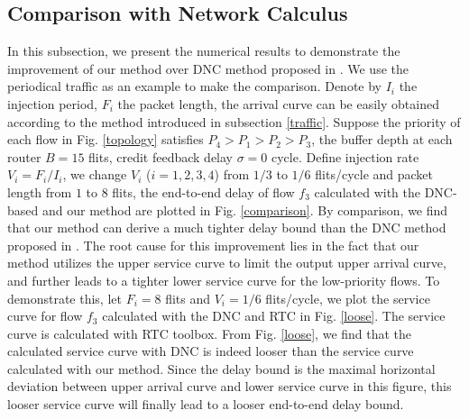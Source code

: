 \documentclass[10pt,journal]{IEEEtran}
\begin{document}
\subsection{Comparison with Network Calculus}\label{dnccmp}
In this subsection, we present the numerical results to demonstrate the improvement of our method over DNC method proposed in \cite{Qian489900}. We use the periodical traffic as an example to make the comparison. Denote by $I_i$ the injection period, $F_i$ the packet length, the arrival curve can be easily obtained according to the method introduced in subsection \ref{traffic}. Suppose the priority of each flow in Fig. \ref{topology} satisfies $P_4>P_1>P_2>P_3$, the buffer depth at each router $B=15$ flits, credit feedback delay $\sigma=0$ cycle. Define injection rate $V_i=F_i/I_i$, we change $V_i$ ($i=1,2,3,4$) from $1/3$ to $1/6$ flits/cycle and packet length from $1$ to $8$ flits, the end-to-end delay of flow $f_3$ calculated with the DNC-based and our method are plotted in Fig. \ref{comparison}. By comparison, we find that our method can derive a much tighter delay bound than the DNC method proposed in \cite{Qian489900}. The root cause for this improvement lies in the fact that our method utilizes the upper service curve to limit the output upper arrival curve, and further leads to a tighter lower service curve for the low-priority flows. To demonstrate this, let $F_i=8$ flits and $V_i=1/6$ flits/cycle, we plot the service curve for flow $f_3$ calculated with the DNC and RTC in Fig. \ref{loose}. The service curve is calculated with RTC toolbox. From Fig. \ref{loose}, we find that the calculated service curve with DNC is indeed looser than the service curve calculated with our method. Since the delay bound is the maximal horizontal deviation between upper arrival curve and lower service curve in this figure, this looser service curve will finally lead to a looser end-to-end delay bound.
\end{document}
